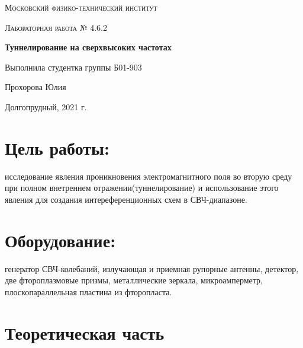 \documentclass[a4paper]{article}
\begin{document}
\begin{titlepage}
	\centering
	\vspace{5cm}
	{\scshape\LARGE Московский физико-технический институт \par}

	\vspace{3cm}
	{\scshape\Large Лабораторная работа № 4.6.2 \par}
	\vspace{1cm}
	{\huge\bfseries  Туннелирование на сверхвысоких частотах\par}
	\vspace{1cm}
	\vfill
\begin{flushright}
	{\large Выполнила студентка группы Б01-903}\par
	\vspace{0.3cm}
	{\LARGE Прохорова Юлия}
\end{flushright}
	
	\vfill

	Долгопрудный, 2021 г.
\end{titlepage}



\newpage


\newpage

\newcommand{\RNumb}[1]{\uppercase\expandafter{\romannumeral #1\relax}}

\pagestyle{fancy} 
\fancyhead{} 
\fancyfoot[C]{\noindent\rule{\textwidth}{0.4pt} \thepage}

\section{Цель работы:} исследование явления проникновения электромагнитного поля во вторую среду при полном внетреннем отражении(туннелирование) и использование этого явления для создания интереференционных схем в СВЧ-диапазоне.  
	
\section{Оборудование:} генератор СВЧ-колебаний, излучающая и приемная рупорные антенны, детектор, две фтороплазмовые призмы, металлические зеркала, микроамперметр, плоскопараллельная пластина из фторопласта.

\section{Теоретическая часть}
\end{document}
